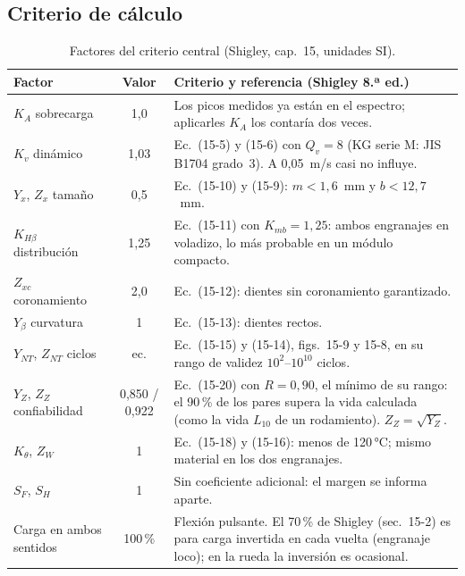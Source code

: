 \documentclass[11pt,a4paper]{article}
\begin{document}
\subsection{Criterio de cálculo}
\begin{table}[!htb]\centering\small
\begin{tabularx}{\linewidth}{l c X}
\toprule
Factor & Valor & Criterio y referencia (Shigley 8.ª ed.)\\\midrule
$K_A$ sobrecarga & 1,0 & Los picos medidos ya están en el espectro; aplicarles $K_A$ los contaría dos veces.\\
$K_v$ dinámico & 1,03 & Ec.~(15-5) y (15-6) con $Q_v=8$ (KG serie M: JIS B1704 grado~3). A 0,05~m/s casi no influye.\\
$Y_x$, $Z_x$ tamaño & 0,5 & Ec.~(15-10) y (15-9): $m<1{,}6$~mm y $b<12{,}7$~mm.\\
$K_{H\beta}$ distribución & 1,25 & Ec.~(15-11) con $K_{mb}=1{,}25$: ambos engranajes en voladizo, lo más probable en un módulo compacto.\\
$Z_{xc}$ coronamiento & 2,0 & Ec.~(15-12): dientes sin coronamiento garantizado.\\
$Y_\beta$ curvatura & 1 & Ec.~(15-13): dientes rectos.\\
$Y_{NT}$, $Z_{NT}$ ciclos & ec. & Ec.~(15-15) y (15-14), figs.~15-9 y 15-8, en su rango de validez $10^2$--$10^{10}$ ciclos.\\
$Y_Z$, $Z_Z$ confiabilidad & 0,850 / 0,922 & Ec.~(15-20) con $R=0{,}90$, el mínimo de su rango: el 90\,\% de los pares supera la vida calculada
                                            (como la vida $L_{10}$ de un rodamiento). $Z_Z=\sqrt{Y_Z}$.\\
$K_\theta$, $Z_W$ & 1 & Ec.~(15-18) y (15-16): menos de 120\,°C; mismo material en los dos engranajes.\\
$S_F$, $S_H$ & 1 & Sin coeficiente adicional: el margen se informa aparte.\\
Carga en ambos sentidos & 100\,\% & Flexión pulsante. El 70\,\% de Shigley (sec.~15-2) es para carga invertida en cada vuelta
                                    (engranaje loco); en la rueda la inversión es ocasional.\\
\bottomrule
\end{tabularx}
\caption{Factores del criterio central (Shigley, cap.~15, unidades SI).}\label{tab:criterio}
\end{table}
\end{document}
